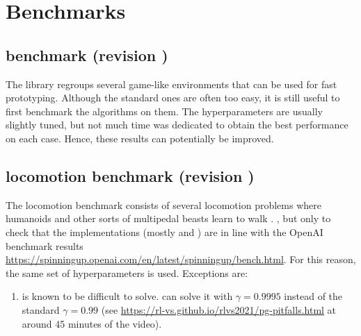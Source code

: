 \chapter{Benchmarks}

\section{\gym benchmark (revision )}

The \gym library regroups several game-like environments that can be used for fast prototyping. Although the standard ones are often too easy, it is still useful to first benchmark the algorithms on them. The hyperparameters are usually slightly tuned, but not much time was dedicated to obtain the best performance on each case. Hence, these results can potentially be improved.



\section{\mujoco locomotion benchmark (revision )}

The \mujoco locomotion benchmark consists of several locomotion problems where humanoids and other sorts of multipedal beasts learn to walk \cite{mujoco}. , but only to check that the implementations (mostly \tdt and \sac) are in line with the OpenAI benchmark results \url{https://spinningup.openai.com/en/latest/spinningup/bench.html}. For this reason, the same set of hyperparameters is used. Exceptions are:

\begin{enumerate}
	\item {} is known to be difficult to solve. \ppo can solve it with $\gamma = 0.9995$ instead of the standard $\gamma = 0.99$ (see \url{https://rl-vs.github.io/rlvs2021/pg-pitfalls.html} at around 45 minutes of the video).
\end{enumerate}

